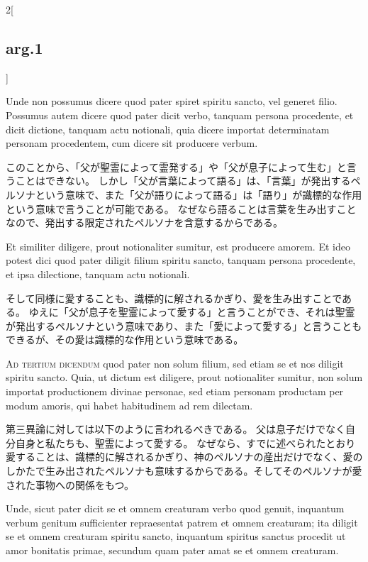 \documentclass[paper=a4paper,fontsize=10pt,jafontsize=9pt,titlepage]{jlreq}
\begin{document}
\begin{paracol}{2}[\subsection{arg.1}]
\switchcolumn*

Unde non possumus dicere quod pater spiret spiritu sancto, vel generet
 filio. Possumus autem dicere quod pater dicit verbo, tanquam persona
 procedente, et dicit dictione, tanquam actu notionali, quia dicere
 importat determinatam personam procedentem, cum dicere sit producere
 verbum.

\switchcolumn

このことから、「父が聖霊によって霊発する」や「父が息子によって生む」と言うことはできない。
しかし「父が言葉によって語る」は、「言葉」が発出するペルソナという意味で、また「父が語りによって語る」は「語り」が識標的な作用という意味で言うことが可能である。
なぜなら語ることは言葉を生み出すことなので、発出する限定されたペルソナを含意するからである。

\switchcolumn*

Et similiter diligere, prout notionaliter sumitur, est
 producere amorem. Et ideo potest dici quod pater diligit filium
 spiritu sancto, tanquam persona procedente, et ipsa dilectione,
 tanquam actu notionali.

\switchcolumn

そして同様に愛することも、識標的に解されるかぎり、愛を生み出すことである。
ゆえに「父が息子を聖霊によって愛する」と言うことができ、それは聖霊が発出するペルソナという意味であり、また「愛によって愛する」と言うこともできるが、その愛は識標的な作用という意味である。

\switchcolumn*[\subsection{ad.3}]

{\scshape Ad tertium dicendum} quod pater non solum filium, sed etiam se et nos
 diligit spiritu sancto. Quia, ut dictum est diligere, prout
 notionaliter sumitur, non solum importat productionem divinae
 personae, sed etiam personam productam per modum amoris, qui habet
 habitudinem ad rem dilectam.

\switchcolumn

第三異論に対しては以下のように言われるべきである。
父は息子だけでなく自分自身と私たちも、聖霊によって愛する。
なぜなら、すでに述べられたとおり愛することは、識標的に解されるかぎり、神のペルソナの産出だけでなく、愛のしかたで生み出されたペルソナも意味するからである。そしてそのペルソナが愛された事物への関係をもつ。

\switchcolumn*

Unde, sicut pater dicit se et omnem
 creaturam verbo quod genuit, inquantum verbum genitum sufficienter
 repraesentat patrem et omnem creaturam; ita diligit se et omnem
 creaturam spiritu sancto, inquantum spiritus sanctus procedit ut amor
 bonitatis primae, secundum quam pater amat se et omnem creaturam.


\end{paracol}
\end{document}
